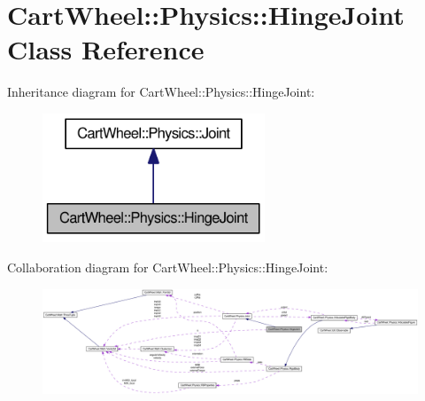 \hypertarget{classCartWheel_1_1Physics_1_1HingeJoint}{
\section{CartWheel::Physics::HingeJoint Class Reference}
\label{classCartWheel_1_1Physics_1_1HingeJoint}
}


Inheritance diagram for CartWheel::Physics::HingeJoint:\nopagebreak
\begin{figure}[H]
\begin{center}
\leavevmode
\includegraphics[width=188pt]{classCartWheel_1_1Physics_1_1HingeJoint__inherit__graph}
\end{center}
\end{figure}


Collaboration diagram for CartWheel::Physics::HingeJoint:\nopagebreak
\begin{figure}[H]
\begin{center}
\leavevmode
\includegraphics[width=400pt]{classCartWheel_1_1Physics_1_1HingeJoint__coll__graph}
\end{center}
\end{figure}
